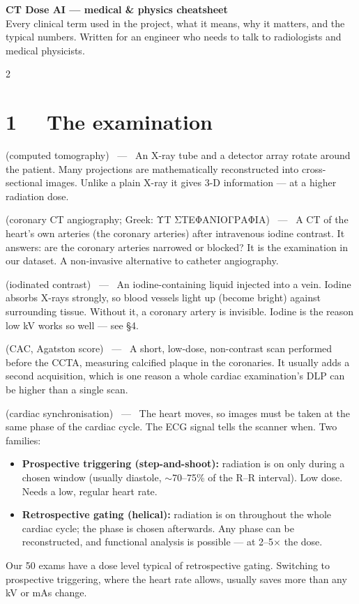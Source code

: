 \documentclass[9pt,a4paper]{extarticle}
\newcommand{\Tg}[3]{\par\smallskip\noindent{\color{ctbluedark}\bfseries #1} {\scriptsize\color{ctink2}(#2)} \ --- \ #3\par}
\newcommand{\note}[1]{{\scriptsize\color{ctink2}#1\par}}
\begin{document}
\begin{tcolorbox}[colback=ctbluedark,colframe=ctbluedark,arc=3pt,left=10pt,right=10pt,top=7pt,bottom=7pt]
{\color{white}\Large\bfseries CT Dose AI --- medical \& physics cheatsheet}\\[2pt]
{\color{white!85}\small Every clinical term used in the project, what it means, why it matters, and the typical
numbers. Written for an engineer who needs to talk to radiologists and medical physicists.}
\end{tcolorbox}

\begin{multicols}{2}

\section{1 \ \ The examination}

\Tg{CT}{computed tomography}{An X-ray tube and a detector array rotate around the patient. Many projections are
mathematically reconstructed into cross-sectional images. Unlike a plain X-ray it gives 3-D information --- at a
higher radiation dose.}

\Tg{CCTA}{coronary CT angiography; Greek: ΥΤ ΣΤΕΦΑΝΙΟΓΡΑΦΙΑ}{A CT of the heart's own arteries (the coronary
arteries) after intravenous iodine contrast. It answers: are the coronary arteries narrowed or blocked? It is the
examination in our dataset. A non-invasive alternative to catheter angiography.}

\Tg{Contrast agent}{iodinated contrast}{An iodine-containing liquid injected into a vein. Iodine absorbs X-rays
strongly, so blood vessels light up (become bright) against surrounding tissue. Without it, a coronary artery is
invisible. Iodine is the reason low kV works so well --- see §4.}

\Tg{Calcium score}{CAC, Agatston score}{A short, low-dose, non-contrast scan performed before the CCTA, measuring
calcified plaque in the coronaries. It usually adds a second acquisition, which is one reason a whole cardiac
examination's DLP can be higher than a single scan.}

\Tg{ECG gating}{cardiac synchronisation}{The heart moves, so images must be taken at the same phase of the cardiac
cycle. The ECG signal tells the scanner when. Two families:}
\begin{itemize}
\item \textbf{Prospective triggering (step-and-shoot):} radiation is on only during a chosen window (usually
diastole, $\sim$70--75\% of the R--R interval). Low dose. Needs a low, regular heart rate.
\item \textbf{Retrospective gating (helical):} radiation is on throughout the whole cardiac cycle; the phase is
chosen afterwards. Any phase can be reconstructed, and functional analysis is possible --- at 2--5$\times$ the dose.
\end{itemize}
\note{Our 50 exams have a dose level typical of retrospective gating. Switching to prospective triggering, where
the heart rate allows, usually saves more than any kV or mAs change.}


\end{multicols}
\end{document}
